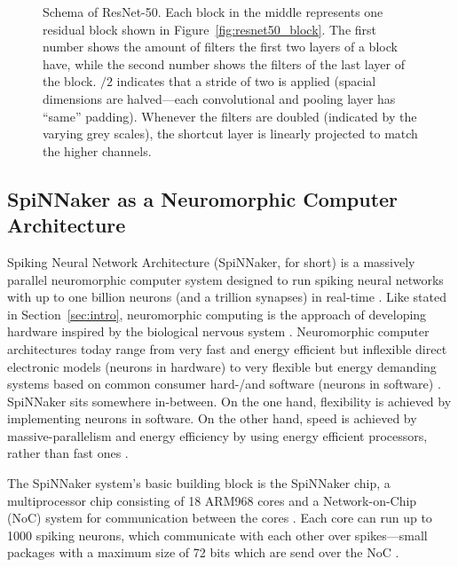 \documentclass[]{article}
\begin{document}
\begin{figure}
\begin{center}
  \end{center}
  \caption{Schema of ResNet-50. Each block in the middle represents
    one residual block shown in Figure~\ref{fig:resnet50_block}.
    The first number shows the amount of filters the first two layers
    of a block have, while the second number shows the filters of the
    last layer of the block. $/2$ indicates that a stride of two is
    applied (spacial dimensions are halved---each convolutional and
    pooling layer has ``same'' padding). Whenever the filters are
    doubled (indicated by the varying grey scales), the shortcut layer
    is linearly projected to match the higher channels.}
  \label{fig:resnet50}
\end{figure}


\subsection{SpiNNaker as a Neuromorphic Computer Architecture} %
\label{subsec:intro_spinn}

Spiking Neural Network Architecture (SpiNNaker, for short) is a
massively parallel neuromorphic computer system designed to run
spiking neural networks with up to one billion neurons (and a trillion
synapses) in real-time \citep{painkras_et_al_2013}.
Like stated in Section~\ref{sec:intro}, neuromorphic computing is
the approach of developing hardware inspired by the biological
nervous system \citep{mead_1989}.
Neuromorphic computer architectures today range from very fast and
energy efficient but inflexible direct electronic models
(neurons in hardware) \citep{indiveri_et_al_2011} to very flexible but
energy demanding systems based on common consumer hard-/and software
(neurons in software) \citep{plesser_et_al_2007}.
SpiNNaker sits somewhere in-between.
On the one hand, flexibility is achieved by implementing neurons in
software.
On the other hand, speed is achieved by massive-parallelism and
energy efficiency by using energy efficient processors, rather than
fast ones \citep{furber_et_al_2020}.

The SpiNNaker system's basic building block is the SpiNNaker chip,
a multiprocessor chip consisting of 18 ARM968 cores and a
Network-on-Chip (NoC) system for communication between the cores
\citep{furber_et_al_2007, furber_et_al_2020}.
Each core can run up to 1000 spiking neurons, which communicate with
each other over spikes---small packages with a maximum size of 72 bits
which are send over the NoC \citep{furber_et_al_2007, spinnaker_2020}.
\end{document}
